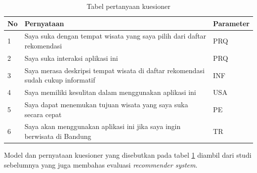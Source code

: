 \begin{table}[h]
\begin{center}
\begin{tabular}{ |l|m{8cm}|l| } 
\hline
	\textbf{No} & \textbf{Pernyataan} & \textbf{Parameter}\\
	\hline
	1 & Saya suka dengan tempat wisata yang saya pilih dari daftar rekomendasi & PRQ \\
	\hline
	2 & Saya suka interaksi aplikasi ini & PRQ \\
	\hline
	3 & Saya merasa deskripsi tempat wisata di daftar rekomendasi sudah cukup informatif & INF \\
	\hline
	4 & Saya memiliki kesulitan dalam menggunakan aplikasi ini & USA \\
	\hline
	5 & Saya dapat menemukan tujuan wisata yang saya suka secara cepat & PE \\
	\hline
	6 & Saya akan menggunakan aplikasi ini jika saya ingin berwisata di Bandung & TR \\
	\hline
\end{tabular}
\end{center}
\caption{Tabel pertanyaan kuesioner}
\label{table:questionnaire}
\end{table}

Model dan pernyataan kuesioner yang disebutkan pada tabel \ref{table:questionnaire} diambil dari studi sebelumnya yang juga membahas
evaluasi \textit{recommender system}\cite{baizalevaluating}. 